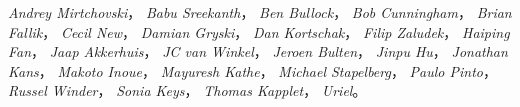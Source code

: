 \emph{Andrey Mirtchovski}，
\emph{Babu Sreekanth}，
\emph{Ben Bullock}，
\emph{Bob Cunningham}，
\emph{Brian Fallik}，
\emph{Cecil New}，
\emph{Damian Gryski}，
\emph{Dan Kortschak}，
\emph{Filip Zaludek}，
\emph{Haiping Fan}，
\emph{Jaap Akkerhuis}，
\emph{JC van Winkel}，
\emph{Jeroen Bulten}，
\emph{Jinpu Hu}，
\emph{Jonathan Kans}，
\emph{Makoto Inoue}，
\emph{Mayuresh Kathe}，
\emph{Michael Stapelberg}，
\emph{Paulo Pinto}，
\emph{Russel Winder}，
\emph{Sonia Keys}，
\emph{Thomas Kapplet}，
\emph{Uriel}。

